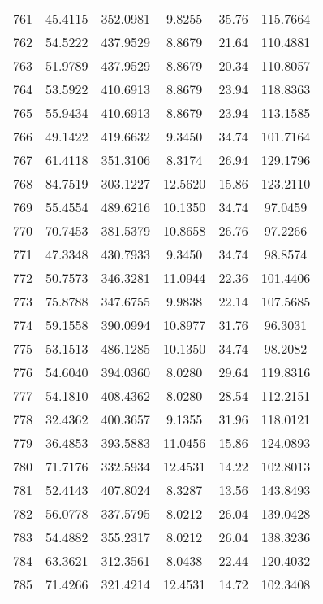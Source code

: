 \begin{center}
\begin{footnotesize}
\begin{tabular}{|c|ccccc|}
761 & 45.4115 & 352.0981 & 9.8255 & 35.76 & 115.7664 \\
762 & 54.5222 & 437.9529 & 8.8679 & 21.64 & 110.4881 \\
763 & 51.9789 & 437.9529 & 8.8679 & 20.34 & 110.8057 \\
764 & 53.5922 & 410.6913 & 8.8679 & 23.94 & 118.8363 \\
765 & 55.9434 & 410.6913 & 8.8679 & 23.94 & 113.1585 \\
766 & 49.1422 & 419.6632 & 9.3450 & 34.74 & 101.7164 \\
767 & 61.4118 & 351.3106 & 8.3174 & 26.94 & 129.1796 \\
768 & 84.7519 & 303.1227 & 12.5620 & 15.86 & 123.2110 \\
769 & 55.4554 & 489.6216 & 10.1350 & 34.74 & 97.0459 \\
770 & 70.7453 & 381.5379 & 10.8658 & 26.76 & 97.2266 \\
771 & 47.3348 & 430.7933 & 9.3450 & 34.74 & 98.8574 \\
772 & 50.7573 & 346.3281 & 11.0944 & 22.36 & 101.4406 \\
773 & 75.8788 & 347.6755 & 9.9838 & 22.14 & 107.5685 \\
774 & 59.1558 & 390.0994 & 10.8977 & 31.76 & 96.3031 \\
775 & 53.1513 & 486.1285 & 10.1350 & 34.74 & 98.2082 \\
776 & 54.6040 & 394.0360 & 8.0280 & 29.64 & 119.8316 \\
777 & 54.1810 & 408.4362 & 8.0280 & 28.54 & 112.2151 \\
778 & 32.4362 & 400.3657 & 9.1355 & 31.96 & 118.0121 \\
779 & 36.4853 & 393.5883 & 11.0456 & 15.86 & 124.0893 \\
780 & 71.7176 & 332.5934 & 12.4531 & 14.22 & 102.8013 \\
781 & 52.4143 & 407.8024 & 8.3287 & 13.56 & 143.8493 \\
782 & 56.0778 & 337.5795 & 8.0212 & 26.04 & 139.0428 \\
783 & 54.4882 & 355.2317 & 8.0212 & 26.04 & 138.3236 \\
784 & 63.3621 & 312.3561 & 8.0438 & 22.44 & 120.4032 \\
785 & 71.4266 & 321.4214 & 12.4531 & 14.72 & 102.3408 \\
\hline
\end{tabular}
\end{footnotesize}
\end{center}

